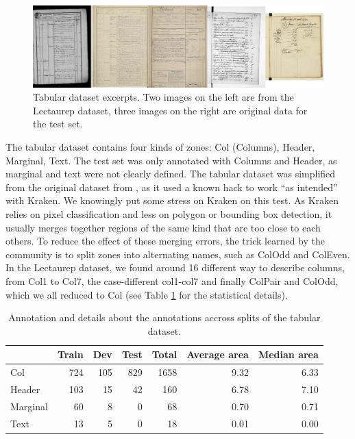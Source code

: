 \documentclass{jdmdh}
\begin{document}
\begin{figure}
    \centering
    \includegraphics[width=\linewidth]{images/table.jpg}
    \caption{Tabular dataset excerpts. Two images on the left are from the Lectaurep dataset, three images on the right are original data for the test set.}
    \label{fig:dataset:table}
\end{figure}

The tabular dataset contains four kinds of zones: Col (Columns), Header, Marginal, Text. The test set was only annotated with Columns and Header, as marginal and text were not clearly defined. The tabular dataset was simplified from the original dataset from \citet{p2021notaires}, as it used a known hack to work ``as intended'' with Kraken. We knowingly put some stress on Kraken on this test. As Kraken relies on pixel classification and less on polygon or bounding box detection, it usually merges together regions of the same kind that are too close to each others. To reduce the effect of these merging errors, the trick learned by the community is to split zones into alternating names, such as ColOdd and ColEven. In the Lectaurep dataset, we found around 16 different way to describe columns, from Col1 to Col7, the case-different col1-col7 and finally ColPair and ColOdd, which we all reduced to Col (see Table \ref{tab:comp:tabular} for the statistical details).

\begin{table}[ht]
    \centering
    \begin{tabular}{l|rrr|r|rr}
    \hline
              &   Train &   Dev &   Test &   Total &   Average area &   Median area \\
    \hline
     Col      &     724 &   105 &    829 &    1658 &           9.32 &          6.33 \\
     Header   &     103 &    15 &     42 &     160 &           6.78 &          7.10 \\
     Marginal &      60 &     8 &      0 &      68 &           0.70 &          0.71 \\
     Text     &      13 &     5 &      0 &      18 &           0.01 &          0.00 \\
    \hline
    \end{tabular}
    \caption{Annotation and details about the annotations accross splits of the tabular  dataset.}
    \label{tab:comp:tabular}
\end{table}
\end{document}
